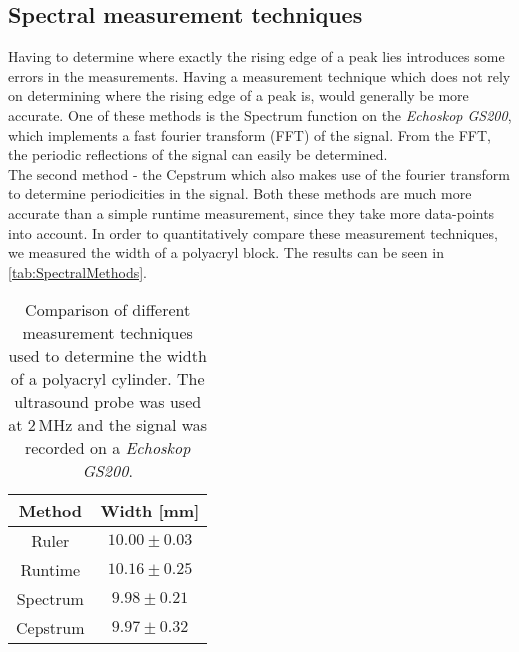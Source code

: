 \documentclass[a4paper,10pt,twocolumn]{article}
\begin{document}
    \subsection{Spectral measurement techniques}\label{subsec:Cepstrum}
    Having to determine where exactly the rising edge of a peak lies introduces some errors in the measurements.
    Having a measurement technique which does not rely on determining where the rising edge of a peak is, would generally be more accurate.
    One of these methods is the Spectrum function on the \textit{Echoskop GS200}, which implements a fast fourier transform (FFT) of the signal.
    From the FFT, the periodic reflections of the signal can easily be determined.
    \\
    The second method - the Cepstrum which also makes use of the fourier transform to determine periodicities in the signal.
    Both these methods are much more accurate than a simple runtime measurement, since they take more data-points into account.
    In order to quantitatively compare these measurement techniques, we measured the width of a polyacryl block.
    The results can be seen in \autoref{tab:SpectralMethods}.
    \begin{table}[htbp]          %
        \centering
        \begin{tabular*}{0.9\linewidth}{@{\extracolsep{\fill}}cc}
            \hline
            \hline
            \rule[-7pt]{0pt}{23pt} Method & Width [mm]  	 \\
            \hline
            \rule[-5pt]{0pt}{23pt}   Ruler & $10.00 \pm 0.03$    \\
            \rule[-5pt]{0pt}{23pt}   Runtime & $10.16 \pm 0.25$  \\
            \rule[-5pt]{0pt}{23pt}   Spectrum & $9.98 \pm 0.21$  \\
            \rule[-5pt]{0pt}{23pt}   Cepstrum  & $9.97 \pm 0.32$ \\
            \hline
            \hline
        \end{tabular*}
        \normalsize
        \caption[]{Comparison of different measurement techniques used to determine the width of a polyacryl cylinder.
        The ultrasound probe was used at $2\,$MHz and the signal was recorded on a \textit{Echoskop GS200}.}  %
        \label{tab:SpectralMethods}                             %
    \end{table}
    
\end{document}
